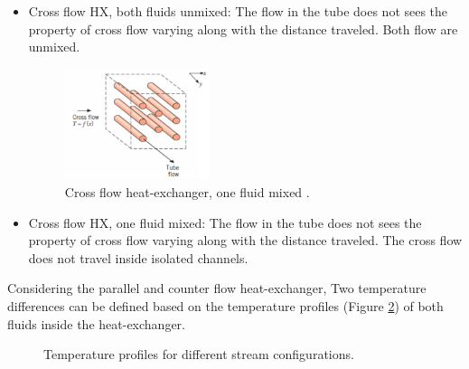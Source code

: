 \begin{itemize}
    \item Cross flow HX, both fluids unmixed: The flow in the tube does not sees the property of cross flow varying along with the distance traveled. Both flow are unmixed.
          \newpage
          \begin{figure}[h]
              \centering
              \includegraphics[width=0.4\textwidth]{crossed_flow_one_mixed}
              \caption{Cross flow heat-exchanger, one fluid mixed \cite{Ngendakumana2018}.}
              \label{fig:C3_cross_flow_1mixed}
          \end{figure}

    \item Cross flow HX, one fluid mixed: The flow in the tube does not sees the property of cross flow varying along with the distance traveled. The cross flow does not travel inside isolated channels.
\end{itemize}

Considering the parallel and counter flow heat-exchanger, Two temperature differences can be defined based on the temperature profiles (Figure \ref{fig:C3_Tprof}) of both fluids inside the heat-exchanger.

\begin{figure}[h]
    \centering
    \hfill
    \caption{Temperature profiles for different stream configurations.}\label{fig:C3_Tprof}
\end{figure}

